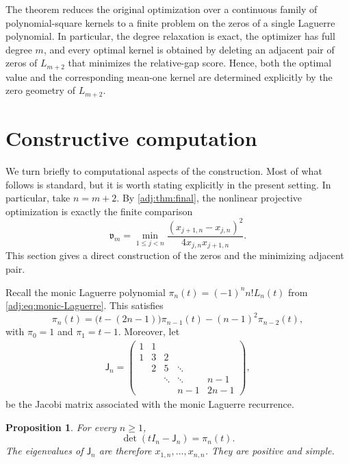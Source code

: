 \documentclass[11pt]{article}
\numberwithin{equation}{section}
\newtheorem{proposition}[theorem]{Proposition}
\theoremstyle{definition}
\theoremstyle{remark}
\newcommand{\Lag}{L}
\begin{document}
The theorem reduces the original optimization over a continuous family of polynomial-square kernels to a finite problem on the zeros of a single Laguerre polynomial. In particular, the degree relaxation is exact, the optimizer has full degree $m$, and every optimal kernel is obtained by deleting an adjacent pair of zeros of $\Lag_{m+2}$ that minimizes the relative-gap score. Hence, both the optimal value and the corresponding mean-one kernel are determined explicitly by the zero geometry of $\Lag_{m+2}$.


\section{Constructive computation}\label{sec:computation}
We turn briefly to computational aspects of the construction. Most of what follows is standard, but it is worth stating explicitly in the present setting. 
In particular, take $n=m+2$. By \cref{adj:thm:final}, the nonlinear projective
optimization is exactly the finite comparison
\begin{equation}\label{num:eq:exact-input}
 \mathfrak v_m
 =\min_{1\le j<n}
 \frac{(x_{j+1,n}-x_{j,n})^2}{4x_{j,n}x_{j+1,n}}.
\end{equation}
This section gives a direct construction of the zeros and the minimizing
adjacent pair.

Recall the monic Laguerre polynomial $\pi_n(t)=(-1)^n n!\Lag_n(t)$ from
\eqref{adj:eq:monic-Laguerre}. This satisfies
\begin{equation}\label{num:eq:monic-recurrence}
 \pi_n(t)
 =
 \bigl(t-(2n-1)\bigr)\pi_{n-1}(t)
 -(n-1)^2\pi_{n-2}(t),
\end{equation}
with $\pi_0=1$ and $\pi_1=t-1$. Moreover, let
\begin{align*}
 \mathsf J_n=
 \begin{pmatrix}
  1 & 1 \\
  1 & 3 & 2 \\
    & 2 & 5 & \ddots \\
    &   & \ddots & \ddots & n-1\\
    &   &        & n-1 & 2n-1
 \end{pmatrix},
\end{align*}
be the Jacobi matrix associated with the monic Laguerre recurrence.
\begin{proposition}\label{num:prop:Jacobi}
For every $n\ge1$,
\[
 \det(tI_n-\mathsf J_n)=\pi_n(t).
\]
The eigenvalues of $\mathsf J_n$ are therefore
$x_{1,n},\ldots,x_{n,n}$. They are positive and simple.
\end{proposition}
\end{document}
